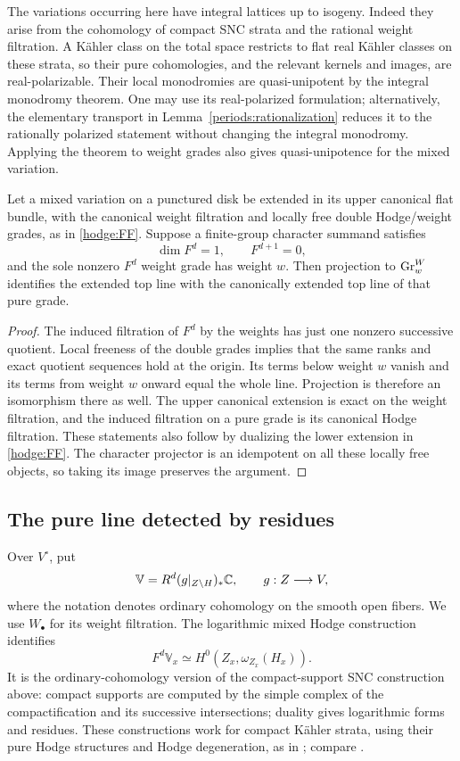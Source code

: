 The variations occurring here have integral lattices up to isogeny.
Indeed they arise from the cohomology of compact SNC strata and the
rational weight filtration.  A K\"ahler class on the total space
restricts to flat real K\"ahler classes on these strata, so their pure
cohomologies, and the relevant kernels and images, are real-polarizable.
Their local monodromies are quasi-unipotent by the integral monodromy
theorem.  One may use its real-polarized formulation; alternatively,
the elementary transport in Lemma~\ref{periods:rationalization}
reduces it to the rationally polarized statement without changing
the integral monodromy.  Applying the theorem to weight grades also
gives quasi-unipotence for the mixed variation.

\begin{lemma}
\label{hodge:doublegrades}
Let a mixed variation on a punctured disk be extended in its upper
canonical flat bundle, with the canonical weight filtration and
locally free double Hodge/weight grades, as in \eqref{hodge:FF}.
Suppose a finite-group character summand satisfies
\[
 \dim F^d=1,\qquad F^{d+1}=0,
\]
and the sole nonzero \(F^d\) weight grade has weight \(w\).
Then projection to \(\operatorname{Gr}^W_w\) identifies the extended top line with
the canonically extended top line of that pure grade.
\end{lemma}

\begin{proof}
The induced filtration of \(F^d\) by the weights has just one
nonzero successive quotient.  Local freeness of the double grades
implies that the same ranks and exact quotient sequences hold at the
origin.  Its terms below weight \(w\) vanish and its terms from
weight \(w\) onward equal the whole line.  Projection is therefore
an isomorphism there as well.  The upper canonical extension is
exact on the weight filtration, and the induced filtration on a
pure grade is its canonical Hodge filtration.  These statements also
follow by dualizing the lower extension in \eqref{hodge:FF}.
The character projector is an idempotent on all these locally free
objects, so taking its image preserves the argument.
\end{proof}

\subsection{The pure line detected by residues}
\label{hodge:pureresidue}

Over \(V^\circ\), put
\[
 \mathbb V=R^d(g|_{Z\setminus H})_*\mathbb C,
 \qquad g:Z\longrightarrow V,
\]
where the notation denotes ordinary cohomology on the smooth open
fibers.  We use \(W_\bullet\) for its weight filtration.  The
logarithmic mixed Hodge construction identifies
\[
 F^d\mathbb V_x
 \simeq H^0(Z_x,\omega_{Z_x}(H_x)).
 \tag{\(\ast\)}
\]
It is the ordinary-cohomology version of the compact-support SNC
construction above: compact supports are computed by the simple
complex of the compactification and its successive intersections;
duality gives logarithmic forms and residues.  These constructions
work for compact K\"ahler strata, using their pure Hodge structures
and Hodge degeneration, as in \cite[Section~4]{FF25}; compare
\cite[Section~3]{Deligne71}.

